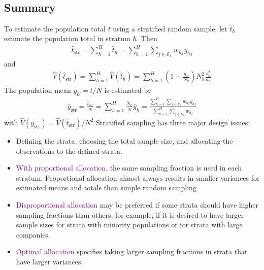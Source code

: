 \documentclass[a4paper,twoside,11pt]{article}
\begin{document}
\begin{equation*}
\begin{aligned}

\end{aligned}
\end{equation*}






\subsection{Summary}
To estimate the population total $t$ using a stratified random sample, let $\hat{t}_h$ estimate the population total in stratum $h$. Then
\begin{equation*}
\begin{aligned}
\hat{t}_{\text{str}} = \sum^H_{h=1} \hat{t}_h = \sum^H_{h=1} \sum_{j \in \mathcal{S}_h} w_{hj} y_{hj}
\end{aligned}
\end{equation*}
and
\begin{equation*}
\begin{aligned}
\hat{V} (\hat{t}_{\text{str}}) = \sum^H_{h=1} \hat{V}(\hat{t}_h) = \sum^H_{h=1} (1-\frac{n_h}{N_h}) N_h^2 \frac{s_h^2}{n_h}
\end{aligned}
\end{equation*}
The population mean $\bar{y}_U = t/N$ is estimated by
\begin{equation*}
\begin{aligned}
\bar{y}_{\text{str}} = \frac{\hat{t}_{\text{str}}}{N} = \sum^H_{h=1} \frac{N_h}{N}\bar{y}_h = \frac{\sum^H_{h=1} \sum_{j \in \mathcal{S}_h} w_{hj} y_{hj}}{\sum^H_{h=1} \sum_{j \in \mathcal{S}_h} w_{hj}}
\end{aligned}
\end{equation*}
with $\hat{V}(\bar{y}_{\text{str}}) = \hat{V}(\hat{t}_{\text{str}})/N^2$
\newline
\newline
Stratified sampling has three major design issues: 
\begin{itemize}
    \item Defining the strata, choosing the total sample size, and allocating the observations to the defined strata.
    \item \textcolor{Purple}{With proportional allocation,} the same sampling fraction is used in each stratum. Proportional allocation almost always results in smaller variances for estimated means and totals than simple random sampling
    \item \textcolor{Purple}{Disproportional allocation} may be preferred if some strata should have higher sampling fractions than others, for example, if it is desired to have larger sample sizes for strata with minority populations or for strata with large companies.
    \item \textcolor{Purple}{Optimal allocation} specifies taking larger sampling fractions in strata that have larger variances.
\end{itemize}
\end{document}
